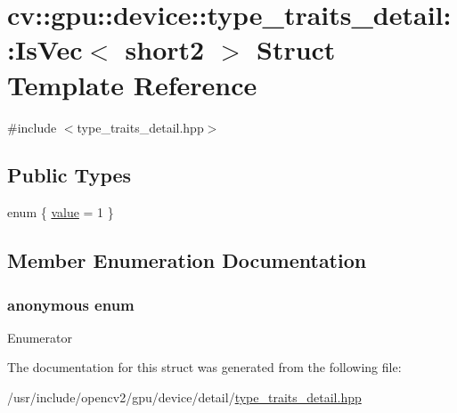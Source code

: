 \hypertarget{structcv_1_1gpu_1_1device_1_1type__traits__detail_1_1IsVec_3_01short2_01_4}{\section{cv\-:\-:gpu\-:\-:device\-:\-:type\-\_\-traits\-\_\-detail\-:\-:Is\-Vec$<$ short2 $>$ Struct Template Reference}
\label{structcv_1_1gpu_1_1device_1_1type__traits__detail_1_1IsVec_3_01short2_01_4}
}


{\ttfamily \#include $<$type\-\_\-traits\-\_\-detail.\-hpp$>$}

\subsection*{Public Types}
\begin{DoxyCompactItemize}
\item 
enum \{ \hyperlink{structcv_1_1gpu_1_1device_1_1type__traits__detail_1_1IsVec_3_01short2_01_4_a37424cfebd4d51fd4188c59bfc77189aacd8efa0aadb34b4e705fcff434fa0a58}{value} = 1
 \}
\end{DoxyCompactItemize}


\subsection{Member Enumeration Documentation}
\hypertarget{structcv_1_1gpu_1_1device_1_1type__traits__detail_1_1IsVec_3_01short2_01_4_a37424cfebd4d51fd4188c59bfc77189a}{\subsubsection[{anonymous enum}]{\setlength{\rightskip}{0pt plus 5cm}anonymous enum}}\label{structcv_1_1gpu_1_1device_1_1type__traits__detail_1_1IsVec_3_01short2_01_4_a37424cfebd4d51fd4188c59bfc77189a}
\begin{Desc}
\item[Enumerator]\par
\begin{description}
\item[{\em 
\hypertarget{structcv_1_1gpu_1_1device_1_1type__traits__detail_1_1IsVec_3_01short2_01_4_a37424cfebd4d51fd4188c59bfc77189aacd8efa0aadb34b4e705fcff434fa0a58}{value}\label{structcv_1_1gpu_1_1device_1_1type__traits__detail_1_1IsVec_3_01short2_01_4_a37424cfebd4d51fd4188c59bfc77189aacd8efa0aadb34b4e705fcff434fa0a58}
}]\end{description}
\end{Desc}


The documentation for this struct was generated from the following file\-:\begin{DoxyCompactItemize}
\item 
/usr/include/opencv2/gpu/device/detail/\hyperlink{type__traits__detail_8hpp}{type\-\_\-traits\-\_\-detail.\-hpp}\end{DoxyCompactItemize}
